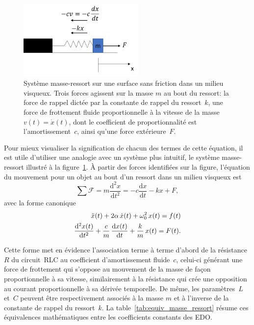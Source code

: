 \documentclass[canadien,12pt,oneside,letterpaper]{article}
\begin{document}
\begin{figure}[h]
    \centering
    \includegraphics[width=0.55\textwidth]{Labos-Complements/Lab08/masse_ressort.png}
    \caption{Système masse-ressort sur une surface sans friction dans un milieu visqueux. Trois forces agissent sur la masse $m$ au bout du ressort: la force de rappel dictée par la constante de rappel du ressort~$k$, une force de frottement fluide proportionnelle à la vitesse de la masse $v(t)=\dot x(t)$, dont le coefficient de proportionnalité est l'amortissement~$c$, ainsi qu'une force extérieure~$F$.}
    \label{fig:systeme_masse_ressort}
\end{figure}
Pour mieux visualiser la signification de chacun des termes de cette équation, il est utile d'utiliser une analogie avec un système plus intuitif, le système masse-ressort illustré à la figure~\ref{fig:systeme_masse_ressort}. À partir des forces identifiées sur la figure, l'équation du mouvement pour un objet au bout d'un ressort dans un milieu visqueux est 
\begin{equation}
      \sum \mathcal{F} = m\frac{\mathrm{d}^2x}{\mathrm{d}t^2} = -c\frac{\mathrm{d}x}{\mathrm{d}t}-kx+F,%
\end{equation}
avec la forme canonique 
\begin{alignat}{2}\label{eq:masse_ressort}
    \ddot x(t) + 2\alpha\,\dot x(t) + \omega_0^2\,x(t) = f(t)\notag\\
    \frac{\mathrm{d}^2x(t)}{\mathrm{d}t^2} + \frac{c}{m}\,\frac{\mathrm{d}x(t)}{\mathrm{d}t} + \frac{k}{m}\,x(t) = F(t).
\end{alignat}

Cette forme met en évidence l'association terme à terme d'abord de la résistance~$R$ du circuit~RLC au coefficient d'amortissement fluide~$c$, celui-ci générant une force de frottement qui s'oppose au mouvement de la masse de façon proportionnelle à sa vitesse, similairement à la résistance qui crée une opposition au courant proportionnelle à sa dérivée temporelle. De même, les paramètres~$L$ et~$C$ peuvent être respectivement associés à la masse $m$ et à l'inverse de la constante de rappel du ressort~$k$. La table~\eqref{tab:equiv_masse_ressort} résume ces équivalences mathématiques entre les coefficients constants des EDO. %
\end{document}
